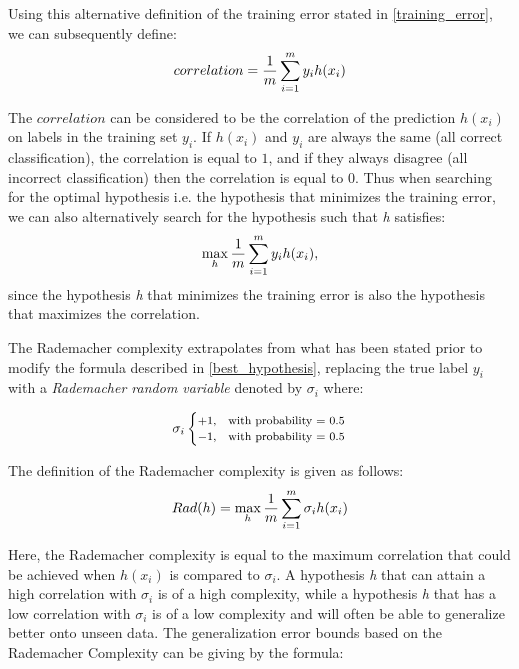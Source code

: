 \documentclass[conference]{IEEEtran}
\begin{document}
\bigbreak
Using this alternative definition of the training error stated in \eqref{training_error}, we can subsequently define: 
\begin{equation}\label{cor}
\footnotesize
correlation = \frac{1}{m}\sum\limits_{i=1}^m y_{i}h(x_{i})
\end{equation}

The $correlation$ can be considered to be the correlation of the prediction $h(x_{i})$ on labels in the training set $y_{i}$. If $h(x_{i})$ and $y_{i}$ are always the same (all correct classification), the correlation is equal to $1$, and if they always disagree (all incorrect classification) then the correlation is equal to $0$.
Thus when searching for the optimal hypothesis i.e. the hypothesis that minimizes the training error, we can also alternatively search for the hypothesis such that \textit{h} satisfies:
\begin{equation}\label{best_hypothesis}
\footnotesize
	\max_{h} \frac{1}{m} \sum\limits_{i=1}^m y_{i}h(x_{i}),
\end{equation}
since the hypothesis \textit{h} that minimizes the training error is also the hypothesis that maximizes the correlation.


The Rademacher complexity extrapolates from what has been stated prior to modify the formula described in \eqref{best_hypothesis}, replacing the true label $y_{i}$ with a \textit{Rademacher random variable} denoted by $\sigma_{i}$ where: 

\begin{equation}\label{random_vector}
\footnotesize
	\sigma_{i}\begin{cases}
    +1, & \text{with probability = 0.5}\\
    -1, & \text{with probability = 0.5}
	\end{cases}
\end{equation}

The definition of the Rademacher complexity is given as follows:
\begin{equation}\label{rademacher}
\footnotesize
	Rad(h) = \max_{h} \frac{1}{m} \sum\limits_{i=1}^m \sigma_{i}h(x_{i})
\end{equation}

Here, the Rademacher complexity is equal to the maximum correlation that could be achieved when $h(x_{i})$ is compared to $\sigma_{i}$. A hypothesis \textit{h} that can attain a high correlation with $\sigma_{i}$ is of a high complexity, while a hypothesis \textit{h} that has a low correlation with $\sigma_{i}$ is of a low complexity and will often be able to generalize better onto unseen data. The generalization error bounds based on the Rademacher Complexity \cite{b26} can be giving by the formula:
\end{document}
